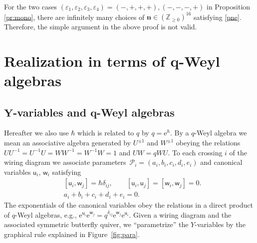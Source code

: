 \documentclass[11pt]{article}
\numberwithin{equation}{section}
\newcommand{\Z}{{\mathbb Z}}
\newcommand{\e}{{\mathrm e}}
\newcommand{\uu}{{\mathsf u}}
\newcommand{\ww}{{\mathsf w}}
\numberwithin{equation}{section}
\begin{document}
\begin{Remark}
 For the two cases
 $(\varepsilon_1,\varepsilon_2,\varepsilon_3,\varepsilon_4)=(-,+,+,+),
 (-,-,-,+)$ in Proposition \ref{pr:mono}, there are infinitely many
 choices of $\mathbf{n} \in (\Z_{\ge 0})^{16}$ satisfying
 \eqref{pne}. Therefore, the simple argument in the above proof is not
 valid.
\end{Remark}


\section[Realization in terms of q-Weyl algebras]{Realization in terms of $\boldsymbol{q}$-Weyl algebras}\label{s:qw}

\subsection[Y-variables and q-Weyl algebras]{$\boldsymbol{Y}$-variables and $\boldsymbol{q}$-Weyl algebras}

Hereafter we also use $\hbar $ which is related to $q$ by
$q=\e^\hbar$. By a $q$-Weyl algebra we mean an associative algebra
generated by $U^{\pm 1}$ and $W^{\pm 1}$ obeying the relations
$U U^{-1} = U^{-1} U= W W^{-1} = W^{-1}W = 1$ and $UW = q WU$.
%
To each crossing $i$ of the wiring diagram we associate parameters~${\mathscr{P}_i = (a_i, b_i, c_i, d_i, e_i)}$ and canonical variables
$\uu_i$, $\ww_i$ satisfying
\begin{align}
&[\uu_i, \ww_j]= \hbar \delta_{ij}, \qquad [\uu_i, \uu_j]=[\ww_i, \ww_j]=0.
\label{uwh}
\\
&a_i+b_i+c_i+d_i+e_i=0.
\label{ae0}
\end{align}
The exponentials of the canonical variables obey the relations in a
direct product of $q$-Weyl algebras, e.g.,
$\e^{\uu_i} \e^{\ww_j} = q^{\delta_{ij}}\e^{\ww_j}\e^{\uu_i}$. Given a wiring
diagram and the associated symmetric butterfly quiver, we
``parametrize'' the $Y$-variables by the graphical rule explained in
Figure~\ref{fig:para}.
\end{document}
